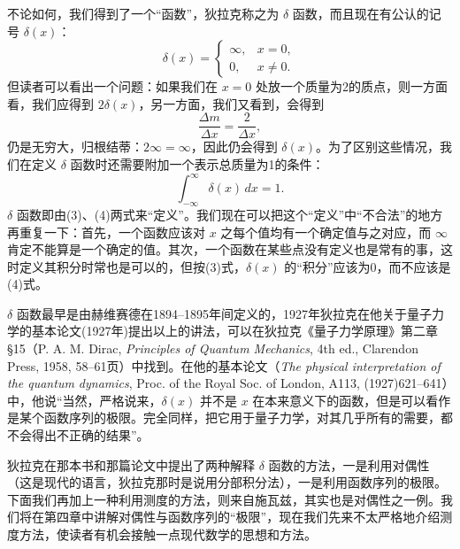 不论如何，我们得到了一个“函数”，狄拉克称之为 $\delta$ 函数，而且现在有公认的记号 $\delta(x)$：
\[
\delta(x)=
\begin{cases}
\infty, & x=0,\\
0, & x\ne0.
\end{cases}
\tag{3}
\]
但读者可以看出一个问题：如果我们在 $x=0$ 处放一个质量为2的质点，则一方面看，我们应得到 $2\delta(x)$，另一方面，我们又看到，会得到
\[
\frac{\Delta m}{\Delta x}=\frac{2}{\Delta x},
\]
仍是无穷大，归根结蒂：$2\infty=\infty$，因此仍会得到 $\delta(x)$。为了区别这些情况，我们在定义 $\delta$ 函数时还需要附加一个表示总质量为1的条件：
\[
\int_{-\infty}^{\infty}\delta(x)\,dx=1.
\tag{4}
\]
$\delta$ 函数即由(3)、(4)两式来“定义”。我们现在可以把这个“定义”中“不合法”的地方再重复一下：首先，一个函数应该对 $x$ 之每个值均有一个确定值与之对应，而 $\infty$ 肯定不能算是一个确定的值。其次，一个函数在某些点没有定义也是常有的事，这时定义其积分时常也是可以的，但按(3)式，$\delta(x)$ 的“积分”应该为0，而不应该是(4)式。

$\delta$ 函数最早是由赫维赛德在1894--1895年间定义的，1927年狄拉克在他关于量子力学的基本论文(1927年)提出以上的讲法，可以在狄拉克《量子力学原理》第二章 §15（P. A. M. Dirac, \textit{Principles of Quantum Mechanics}, 4th ed., Clarendon Press, 1958, 58--61页）中找到。在他的基本论文（\textit{The physical interpretation of the quantum dynamics}, Proc. of the Royal Soc. of London, A113, (1927)621--641）中，他说“当然，严格说来，$\delta(x)$ 并不是 $x$ 在本来意义下的函数，但是可以看作是某个函数序列的极限。完全同样，把它用于量子力学，对其几乎所有的需要，都不会得出不正确的结果”。

狄拉克在那本书和那篇论文中提出了两种解释 $\delta$ 函数的方法，一是利用对偶性（这是现代的语言，狄拉克那时是说用分部积分法），一是利用函数序列的极限。下面我们再加上一种利用测度的方法，则来自施瓦兹，其实也是对偶性之一例。我们将在第四章中讲解对偶性与函数序列的“极限”，现在我们先来不太严格地介绍测度方法，使读者有机会接触一点现代数学的思想和方法。

